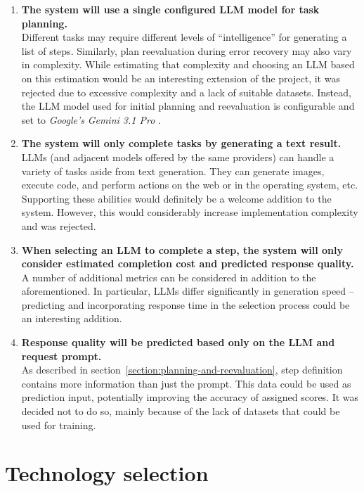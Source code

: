 \documentclass[a4paper,11pt,twoside]{report}
\theoremstyle{definition}
\begin{document}
\begin{enumerate}
    \item \textbf{The system will use a single configured LLM model for task planning.} \\
    Different tasks may require different levels of ``intelligence'' for generating a list of steps. Similarly, plan reevaluation during error recovery may also vary in complexity. While estimating that complexity and choosing an LLM based on this estimation would be an interesting extension of the project, it was rejected due to excessive complexity and a lack of suitable datasets. Instead, the LLM model used for initial planning and reevaluation is configurable and set to \textit{Google's} \textit{Gemini 3.1 Pro} \cite{google2026gemini31pro}.
    \item \textbf{The system will only complete tasks by generating a text result.} \\
    LLMs (and adjacent models offered by the same providers) can handle a variety of tasks aside from text generation. They can generate images, execute code, and perform actions on the web or in the operating system, etc. Supporting these abilities would definitely be a welcome addition to the system. However, this would considerably increase implementation complexity and was rejected. 
    \item \textbf{When selecting an LLM to complete a step, the system will only consider estimated completion cost and predicted response quality.} \\
    A number of additional metrics can be considered in addition to the aforementioned. In particular, LLMs differ significantly in generation speed -- predicting and incorporating response time in the selection process could be an interesting addition.
    \item \textbf{Response quality will be predicted based only on the LLM and request prompt.} \\
    As described in section~\ref{section:planning-and-reevaluation}, step definition contains more information than just the prompt. This data could be used as prediction input, potentially improving the accuracy of assigned scores. It was decided not to do so, mainly because of the lack of datasets that could be used for training.
\end{enumerate}

\section{Technology selection}
\label{section:technology-selection}
\end{document}
